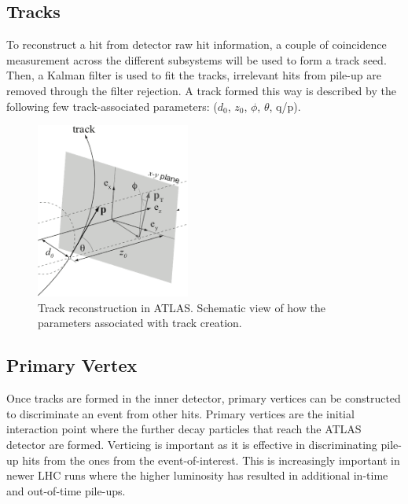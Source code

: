 \subsection*{Tracks}
To reconstruct a hit from detector raw hit information, a couple of  coincidence measurement across the different subsystems will be used to form a track seed. Then, a Kalman filter is used to fit the tracks,  irrelevant hits from pile-up are removed through the filter rejection.  
A track formed this way is described by the following few track-associated parameters: ($d_{0}$, $z_{0}$, $\phi$, $\theta$, q/p).

\begin{figure}[!htb]
    \begin{center}
        \includegraphics[width=0.45\textwidth]{figures/common_ana/Track}
        \caption{ 
            Track reconstruction in ATLAS. Schematic view of how the parameters associated with track creation.
        }
        \label{fig:isolationWP}
    \end{center}
\end{figure}


\subsection*{Primary Vertex}
Once tracks are formed in the inner detector, primary vertices can be constructed to discriminate an event from other hits. 
Primary vertices are the initial interaction point where the further decay particles that reach the ATLAS detector are formed. Verticing is important as it is effective in discriminating pile-up hits from the ones from the event-of-interest. This is increasingly important in newer LHC runs where the higher luminosity has resulted in additional in-time and out-of-time pile-ups. 

